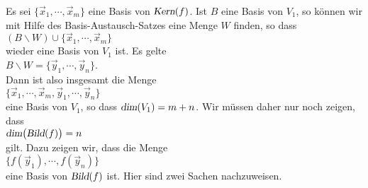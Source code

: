 \proof
Es sei $\{ \vec{x}_1, \cdots, \vec{x}_m \}$ eine Basis von $\textsl{Kern}(f)$.  Ist $B$ eine Basis von $V_1$, so k\"{o}nnen wir mit Hilfe des
Basis-Austausch-Satzes eine Menge $W$ finden, so dass 
\\[0.2cm]
\hspace*{1.3cm}
$(B \backslash W) \cup \{ \vec{x}_1, \cdots, \vec{x}_m \}$
\\[0.2cm]
wieder eine Basis von $V_1$ ist.  Es gelte
\\[0.2cm]
\hspace*{1.3cm}
$B \backslash W = \{ \vec{y}_1, \cdots, \vec{y}_n \}$.
\\[0.2cm]
Dann ist also insgesamt die Menge
\\[0.2cm]
\hspace*{1.3cm}
$\{  \vec{x}_1, \cdots, \vec{x}_m,  \vec{y}_1, \cdots, \vec{y}_n \}$
\\[0.2cm]
eine Basis von $V_1$, so dass $\textsl{dim}(V_1) = m + n$.  Wir m\"{u}ssen daher nur noch zeigen, dass 
\\[0.2cm]
\hspace*{1.3cm}
$\textsl{dim}\bigl(\textsl{Bild}(f)\bigr) = n$ 
\\[0.2cm] 
gilt.  Dazu zeigen wir, dass die Menge
\\[0.2cm]
\hspace*{1.3cm}
$\{ f(\vec{y}_1), \cdots, f(\vec{y}_n) \}$
\\[0.2cm]
eine Basis von $\textsl{Bild}(f)$ ist.  Hier sind zwei Sachen nachzuweisen.
